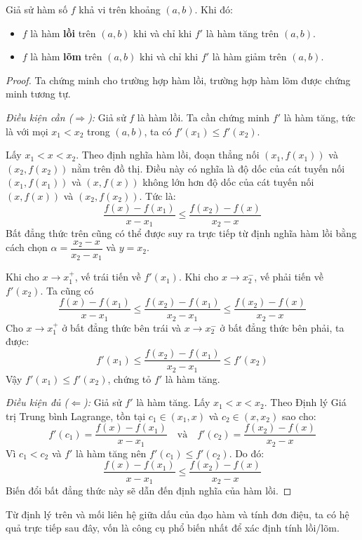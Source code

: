 \begin{theorem}
\label{thm:convexity_and_derivative}
Giả sử hàm số $f$ khả vi trên khoảng $(a,b)$. Khi đó:
\begin{itemize}
    \item $f$ là hàm \textbf{lồi} trên $(a,b)$ khi và chỉ khi $f'$ là hàm tăng trên $(a,b)$.
    \item $f$ là hàm \textbf{lõm} trên $(a,b)$ khi và chỉ khi $f'$ là hàm giảm trên $(a,b)$.
\end{itemize}
\end{theorem}
\begin{proof}
Ta chứng minh cho trường hợp hàm lồi, trường hợp hàm lõm được chứng minh tương tự.

\textit{Điều kiện cần ($\Rightarrow$):} Giả sử $f$ là hàm lồi. Ta cần chứng minh $f'$ là hàm tăng, tức là với mọi $x_1 < x_2$ trong $(a,b)$, ta có $f'(x_1) \le f'(x_2)$.

Lấy $x_1 < x < x_2$. Theo định nghĩa hàm lồi, đoạn thẳng nối $(x_1, f(x_1))$ và $(x_2, f(x_2))$ nằm trên đồ thị. Điều này có nghĩa là độ dốc của cát tuyến nối $(x_1, f(x_1))$ và $(x, f(x))$ không lớn hơn độ dốc của cát tuyến nối $(x, f(x))$ và $(x_2, f(x_2))$. Tức là:
$$ \dfrac{f(x) - f(x_1)}{x - x_1} \le \dfrac{f(x_2) - f(x)}{x_2 - x} $$
Bất đẳng thức trên cũng có thể được suy ra trực tiếp từ định nghĩa hàm lồi bằng cách chọn $\alpha = \dfrac{x_2 - x}{x_2 - x_1}$ và $y=x_2$.

Khi cho $x \to x_1^+$, vế trái tiến về $f'(x_1)$. Khi cho $x \to x_2^-$, vế phải tiến về $f'(x_2)$.
Ta cũng có
$$ \dfrac{f(x) - f(x_1)}{x - x_1} \le \dfrac{f(x_2) - f(x_1)}{x_2 - x_1} \le \dfrac{f(x_2) - f(x)}{x_2 - x} $$
Cho $x \to x_1^+$ ở bất đẳng thức bên trái và $x \to x_2^-$ ở bất đẳng thức bên phải, ta được:
$$ f'(x_1) \le \dfrac{f(x_2) - f(x_1)}{x_2 - x_1} \le f'(x_2) $$
Vậy $f'(x_1) \le f'(x_2)$, chứng tỏ $f'$ là hàm tăng.

\textit{Điều kiện đủ ($\Leftarrow$):} Giả sử $f'$ là hàm tăng. Lấy $x_1 < x < x_2$. Theo Định lý Giá trị Trung bình Lagrange, tồn tại $c_1 \in (x_1, x)$ và $c_2 \in (x, x_2)$ sao cho:
$$ f'(c_1) = \dfrac{f(x) - f(x_1)}{x - x_1} \quad \text{và} \quad f'(c_2) = \dfrac{f(x_2) - f(x)}{x_2 - x} $$
Vì $c_1 < c_2$ và $f'$ là hàm tăng nên $f'(c_1) \le f'(c_2)$. Do đó:
$$ \dfrac{f(x) - f(x_1)}{x - x_1} \le \dfrac{f(x_2) - f(x)}{x_2 - x} $$
Biến đổi bất đẳng thức này sẽ dẫn đến định nghĩa của hàm lồi.
\end{proof}

Từ định lý trên và mối liên hệ giữa dấu của đạo hàm và tính đơn điệu, ta có hệ quả trực tiếp sau đây, vốn là công cụ phổ biến nhất để xác định tính lồi/lõm.

